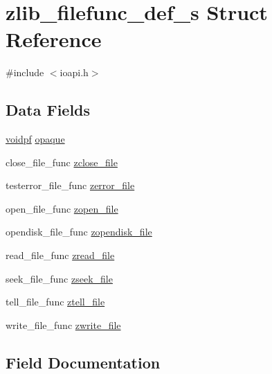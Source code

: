 \hypertarget{structzlib__filefunc__def__s}{}\section{zlib\+\_\+filefunc\+\_\+def\+\_\+s Struct Reference}
\label{structzlib__filefunc__def__s}


{\ttfamily \#include $<$ioapi.\+h$>$}

\subsection*{Data Fields}
\begin{DoxyCompactItemize}
\item 
\hyperlink{ioapi_8h_a39ab6d73c1cd44bc17064c2dcbb3e753}{voidpf} \hyperlink{structzlib__filefunc__def__s_a494b6d634b61bdc7fc7caed8e4fbe3f4}{opaque}
\item 
close\+\_\+file\+\_\+func \hyperlink{structzlib__filefunc__def__s_ac46ac7ec0540dce117dab3f210d26763}{zclose\+\_\+file}
\item 
testerror\+\_\+file\+\_\+func \hyperlink{structzlib__filefunc__def__s_a61182b5b3ff83fb509b57ab4d2d9816d}{zerror\+\_\+file}
\item 
open\+\_\+file\+\_\+func \hyperlink{structzlib__filefunc__def__s_a49b78a559140e495b94af4d9dfe5c4e9}{zopen\+\_\+file}
\item 
opendisk\+\_\+file\+\_\+func \hyperlink{structzlib__filefunc__def__s_a1f1f58ad043ed584284294646be0a8c7}{zopendisk\+\_\+file}
\item 
read\+\_\+file\+\_\+func \hyperlink{structzlib__filefunc__def__s_ab14f748de7516525e5d2b78c47aca92e}{zread\+\_\+file}
\item 
seek\+\_\+file\+\_\+func \hyperlink{structzlib__filefunc__def__s_a4747bdf97a3f44fe4b958114c11e1dcf}{zseek\+\_\+file}
\item 
tell\+\_\+file\+\_\+func \hyperlink{structzlib__filefunc__def__s_ac8b933601443cdd83f8cc02004c77d0d}{ztell\+\_\+file}
\item 
write\+\_\+file\+\_\+func \hyperlink{structzlib__filefunc__def__s_a710b490fec793486ef5bedd9f2e1136d}{zwrite\+\_\+file}
\end{DoxyCompactItemize}


\subsection{Field Documentation}
\mbox{\label{structzlib__filefunc__def__s_a494b6d634b61bdc7fc7caed8e4fbe3f4}} 
